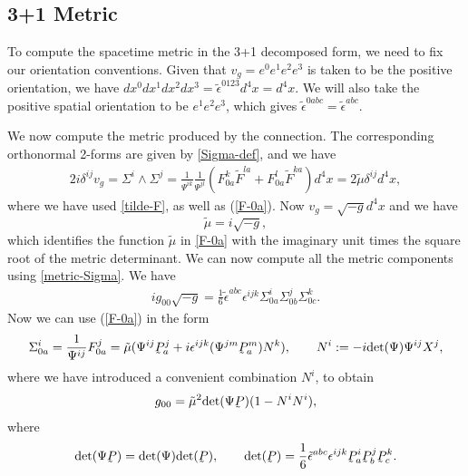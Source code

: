 \documentclass[10pt]{report}
\newcommand{\utilde}[1]{\underaccent{\tilde}{#1}}
\theoremstyle{definition}
\newcommand{\im}{i}
\begin{document}
\subsection{3+1 Metric}

To compute the spacetime metric in the 3+1 decomposed form, we need to fix our orientation conventions. Given that $v_g= e^0e^1 e^2e^3$ is taken to be the positive orientation, we have $dx^0 dx^1 dx^2 dx^3 = \tilde{\epsilon}^{0123} d^4x = d^4x$. We will also take the positive spatial orientation to be $e^1 e^2 e^3$, which gives $\tilde{\epsilon}^{0abc}= \tilde{\epsilon}^{abc}$.

We now compute the metric produced by the connection. The corresponding orthonormal 2-forms are given by \cref{Sigma-def}, and we have
\begin{align}
    2i\delta^{ij} v_g =  \Sigma^i \wedge \Sigma^j  = \frac{1}{\Psi^{ik}}\frac{1}{\Psi^{jl}} (F^k_{0a} \tilde{F}^{la} + F^l_{0a} \tilde{F}^{ka}) d^4x= 2\tilde{\mu}\delta^{ij} d^4x,
\end{align}
where we have used \cref{tilde-F}, as well as (\ref{F-0a}). Now $v_g =  \sqrt{-g}  d^4x$ and we have
\begin{equation}
   \tilde{\mu}=\im \sqrt{-g},
\end{equation}
which identifies the function $\tilde{\mu}$ in \cref{F-0a} with the imaginary unit times the square root of the metric determinant. We can now compute all the metric components using \cref{metric-Sigma}. We have
\begin{align}
\im g_{00} \sqrt{-g} =  \frac{1}{6} \tilde{\epsilon}^{abc} \epsilon^{ijk} \Sigma^i_{0a} \Sigma^j_{0b} \Sigma^k_{0c}.
\end{align}
Now we can use (\ref{F-0a}) in the form
\begin{align}\label{Sigma-0}
\Sigma^i_{0a}= \frac{1}{\Psi^{ij}} F^j_{0a} = \tilde{\mu} (\Psi^{ij} \utilde{P}^j_a + \im \epsilon^{ijk} (\Psi^{jm} \utilde{P}^m_a) N^k), \qquad N^i := -\im{\rm det}(\Psi) \Psi^{ij} X^j,
\end{align}
where we have introduced a convenient combination $N^i$, to obtain
\begin{align}\label{g00}
g_{00}  =  \tilde{\mu}^2 {\rm det}(\Psi \utilde{P}) (1- N^i N^i),
\end{align}
where
\begin{align}
{\rm det}(\Psi \utilde{P}) = {\rm det}(\Psi) {\rm det}(\utilde{P}), \qquad {\rm det}(\utilde{P})= \frac{1}{6} \tilde{\epsilon}^{abc} \epsilon^{ijk} \utilde{P}^i_a \utilde{P}^j_b \utilde{P}^k_c.
\end{align}
\end{document}
